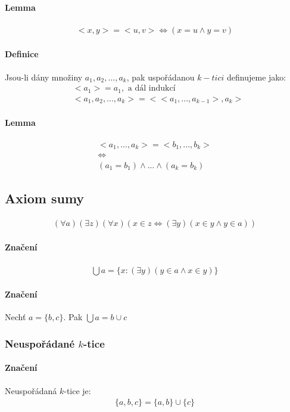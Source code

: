 \documentclass[a4paper,12pt,titlepage]{article}
\begin{document}
\paragraph{Lemma}
\begin{align}
	<x,y> = <u,v> \Leftrightarrow (x = u \land y = v)
\end{align}
\paragraph{Definice}
Jsou-li dány množiny $a_1, a_2, ..., a_k$, pak uspořádanou $k-tici$ definujeme
jako:
\begin{align}
	&<a_1> = a_1, \text{ a dál indukcí } \\
	&<a_1, a_2, ..., a_k > = <<a_1, ..., a_{k-1}>, a_k>
\end{align}
\paragraph{Lemma}
\begin{align}
	<a_1, ..., a_k> = <b_1, ..., b_k> \\
	\Leftrightarrow \\
	(a_1 = b_1) \land ... \land (a_k = b_k)
\end{align}


\subsection{Axiom sumy}
\setcounter{equation}{0}
\begin{align}
	(\forall a) (\exists z) (\forall x) (x \in z \Leftrightarrow (\exists y)(x
	\in y \land  y \in a))
\end{align}
\paragraph{Značení}
\begin{align}
	\bigcup a = \{ x : (\exists y) (y \in a \land x \in y) \}
\end{align}
\paragraph{Značení}
Nechť $a = \{b,c\}$. Pak $\bigcup a = b \cup c$

\subsubsection{Neuspořádané $k$-tice}
\setcounter{equation}{0}
\paragraph{Značení}
Neuspořádaná $k$-tice je:
\begin{align}
	\{a,b,c\} = \{a,b\} \cup \{c\}
\end{align}
\end{document}
